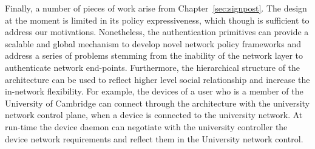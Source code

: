 Finally, a number of pieces of work arise from Chapter~\ref{sec:signpost}.  The
\signpost design at the moment is limited in  its policy expressiveness, which
though is sufficient to address our motivations.  Nonetheless, the
authentication primitives can provide a scalable and global mechanism to develop
novel network policy frameworks and address a series of problems stemming from
the inability of the network layer to authenticate network end-points.
Furthermore, the hierarchical structure of the \signpost architecture can be
used to reflect higher level social relationship and increase the in-network
flexibility. For example, the devices of a user who is a member of the University
of Cambridge can connect through the \signpost architecture with the university
network control plane,  when a device is connected to the university network. 
At run-time the device \signpost daemon can negotiate with the university
\signpost controller the device network requirements and reflect them in the
University network control. 
